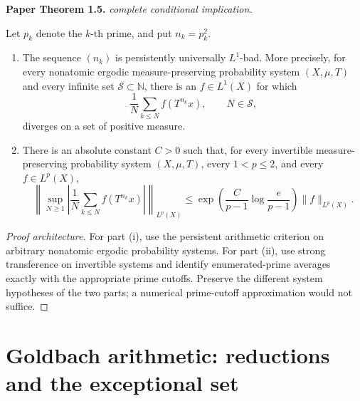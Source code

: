 \begin{theorem}
\label{prime_square_ergodic_theorem}
\leanok
\par\medskip\noindent\textbf{Paper Theorem 1.5.} \textit{complete conditional implication.}\par
Let \(p_k\) denote the \(k\)-th prime, and put \(n_k=p_k^2\).
\begin{enumerate}
\item
The sequence \((n_k)\) is persistently universally \(L^1\)-bad.
More precisely, for every nonatomic ergodic measure-preserving
probability system \((X,\mu,T)\) and every infinite set
\(\mathcal S\subset\mathbb N\), there is an \(f\in L^1(X)\)
for which
\[
 \frac1N\sum_{k\leq N}f(T^{n_k}x),
 \qquad N\in\mathcal S,
\]
diverges on a set of positive measure.
\item
There is an absolute constant \(C>0\) such that, for every
invertible measure-preserving probability system \((X,\mu,T)\),
every \(1<p\leq2\), and every \(f\in L^p(X)\),
\[
 \left\|
 \sup_{N\geq1}
 \left|\frac1N\sum_{k\leq N}f(T^{n_k}x)\right|
 \right\|_{L^p(X)}
 \leq
 \exp\left(
 \frac{C}{p-1}\log\frac{e}{p-1}
 \right)
 \|f\|_{L^p(X)}.
\]
\end{enumerate}
\end{theorem}
\begin{proof}[Proof architecture]
\leanok
For part (i), use the persistent arithmetic criterion on arbitrary nonatomic ergodic probability systems. For part (ii), use strong transference on invertible systems and identify enumerated-prime averages exactly with the appropriate prime cutoffs. Preserve the different system hypotheses of the two parts; a numerical prime-cutoff approximation would not suffice.
\end{proof}

\section{Goldbach arithmetic: reductions and the exceptional set}

